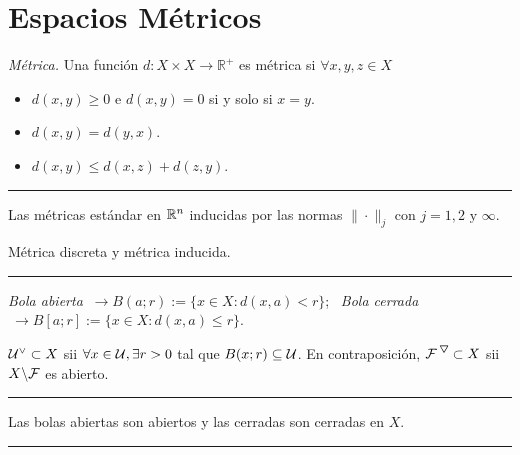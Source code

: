 \section*{Espacios Métricos}

\begin{definition}
    \emph{Métrica.} Una función \(d:X\times X\to \mathbb{R}^+\) es métrica si \(\forall x,y,z \in X\)  
    \begin{itemize}
        \item \(d(x,y)\geq 0\) e \(d(x,y)=0\) si y solo si \(x = y\). 
        \item \(d(x,y) = d(y,x)\). 
        \item \(d(x,y) \leq d(x,z) + d(z,y)\). 
    \end{itemize}
\end{definition}

\E

\hrule 
\begin{example}
    Las métricas estándar en \(\mathbb{R}^n\) inducidas por las normas \(\|\cdot\|_j\) con \(j = 1, 2 \text{\ y\ }\infty\). 
\end{example}
\begin{example}
    Métrica discreta y métrica inducida. 
\end{example}
\hrule 

\E

\begin{definition}
    \emph{Bola abierta} \(\ \to B(a;r) := \{x\in X : d(x,a) < r\}\); \ \emph{Bola cerrada} \(\ \to B[a;r]:= \{x\in X : d(x,a)\leq r\}\). 
\end{definition}
\begin{definition}
   \(\U^\ab \subset X\) sii \(\forall x\in \mathcal{U}, \exists r>0\) tal que \(B(x;r)\subseteq \mathcal{U}\). En contraposición, \(\F^\ce\subset X \) sii \(X\backslash \mathcal{F}\) es abierto. 
\end{definition}

\E

\hrule 
\begin{exercise}
    Las bolas abiertas son abiertos y las cerradas son cerradas en \(X\). 
\end{exercise}
\hrule 

\E

